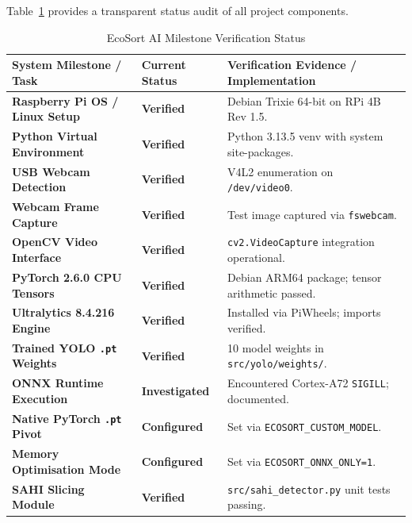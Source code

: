 \documentclass[12pt,a4paper]{article}
\begin{document}
Table~\ref{tab:progress} provides a transparent status audit of all project components.

\begin{table}[H]
\centering
\caption{EcoSort AI Milestone Verification Status}\label{tab:progress}
\begin{tabular}{llp{7.2cm}}
\toprule
\textbf{System Milestone / Task} & \textbf{Current Status} & \textbf{Verification Evidence / Implementation} \\
\midrule
\textbf{Raspberry Pi OS / Linux Setup}   & \textcolor{ecosortgreen}{\textbf{Verified}} & Debian Trixie 64-bit on RPi 4B Rev 1.5. \\
\textbf{Python Virtual Environment}      & \textcolor{ecosortgreen}{\textbf{Verified}} & Python 3.13.5 venv with system site-packages. \\
\textbf{USB Webcam Detection}            & \textcolor{ecosortgreen}{\textbf{Verified}} & V4L2 enumeration on \texttt{/dev/video0}. \\
\textbf{Webcam Frame Capture}            & \textcolor{ecosortgreen}{\textbf{Verified}} & Test image captured via \texttt{fswebcam}. \\
\textbf{OpenCV Video Interface}          & \textcolor{ecosortgreen}{\textbf{Verified}} & \texttt{cv2.VideoCapture} integration operational. \\
\textbf{PyTorch 2.6.0 CPU Tensors}       & \textcolor{ecosortgreen}{\textbf{Verified}} & Debian ARM64 package; tensor arithmetic passed. \\
\textbf{Ultralytics 8.4.216 Engine}      & \textcolor{ecosortgreen}{\textbf{Verified}} & Installed via PiWheels; imports verified. \\
\textbf{Trained YOLO \texttt{.pt} Weights}& \textcolor{ecosortgreen}{\textbf{Verified}} & 10 model weights in \texttt{src/yolo/weights/}. \\
\textbf{ONNX Runtime Execution}          & \textcolor{warnyellow}{\textbf{Investigated}} & Encountered Cortex-A72 \texttt{SIGILL}; documented. \\
\textbf{Native PyTorch \texttt{.pt} Pivot}& \textcolor{ecosortgreen}{\textbf{Configured}} & Set via \texttt{ECOSORT\_CUSTOM\_MODEL}. \\
\textbf{Memory Optimisation Mode}        & \textcolor{ecosortgreen}{\textbf{Configured}} & Set via \texttt{ECOSORT\_ONNX\_ONLY=1}. \\
\textbf{SAHI Slicing Module}             & \textcolor{ecosortgreen}{\textbf{Verified}} & \texttt{src/sahi\_detector.py} unit tests passing. \\

\end{tabular}
\end{table}
\end{document}
